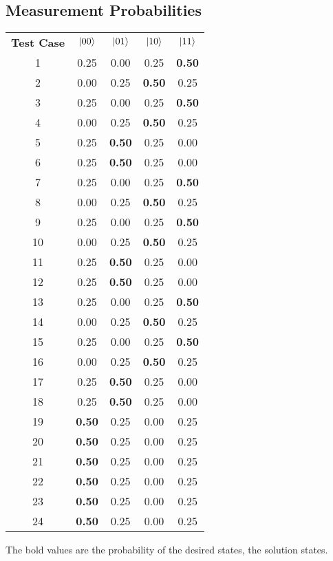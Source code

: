 \subsection{Measurement Probabilities}
\label{sec:maxpermmeasprobs}
\centering
 \begin{tabular}{c|c|c|c|c|}
\textbf{Test Case} & $\left\vert{00}\right\rangle$& $\left\vert{01}\right\rangle$& $\left\vert{10}\right\rangle$& $\left\vert{11}\right\rangle$ \\
1 & 0.25 & 0.00 & 0.25 & \textbf{0.50} \\
2 & 0.00 & 0.25 & \textbf{0.50} & 0.25 \\
3 & 0.25 & 0.00 & 0.25 & \textbf{0.50} \\
4 & 0.00 & 0.25 & \textbf{0.50} & 0.25 \\
5 & 0.25 & \textbf{0.50} & 0.25 & 0.00 \\
6 & 0.25 & \textbf{0.50} & 0.25 & 0.00 \\
7 & 0.25 & 0.00 & 0.25 & \textbf{0.50} \\
8 & 0.00 & 0.25 & \textbf{0.50} & 0.25 \\
9 & 0.25 & 0.00 & 0.25 & \textbf{0.50} \\
10 & 0.00 & 0.25 & \textbf{0.50} & 0.25 \\
11 & 0.25 & \textbf{0.50} & 0.25 & 0.00 \\
12 & 0.25 & \textbf{0.50} & 0.25 & 0.00 \\
13 & 0.25 & 0.00 & 0.25 & \textbf{0.50} \\
14 & 0.00 & 0.25 & \textbf{0.50} & 0.25 \\
15 & 0.25 & 0.00 & 0.25 & \textbf{0.50} \\
16 & 0.00 & 0.25 & \textbf{0.50} & 0.25 \\
17 & 0.25 & \textbf{0.50} & 0.25 & 0.00 \\
18 & 0.25 & \textbf{0.50} & 0.25 & 0.00 \\
19 & \textbf{0.50} & 0.25 & 0.00 & 0.25 \\
20 & \textbf{0.50} & 0.25 & 0.00 & 0.25 \\
21 & \textbf{0.50} & 0.25 & 0.00 & 0.25 \\
22 & \textbf{0.50} & 0.25 & 0.00 & 0.25 \\
23 & \textbf{0.50} & 0.25 & 0.00 & 0.25 \\
24 & \textbf{0.50} & 0.25 & 0.00 & 0.25
 \end{tabular}

The bold values are the probability of the desired states, the solution states.